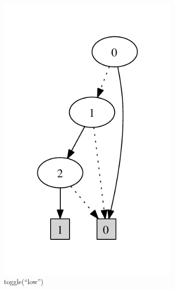 \begin{figure}
    \centering   
    \begin{subfigure}[b]{0.15\textwidth}
        \includegraphics[width=\textwidth]{figures/bdd1.pdf}
        \caption{toggle(``low'')}
        \label{fig:bdd1}
    \end{subfigure}
    ~ 
    \begin{subfigure}[b]{0.15\textwidth}

\end{subfigure}
\end{figure}
